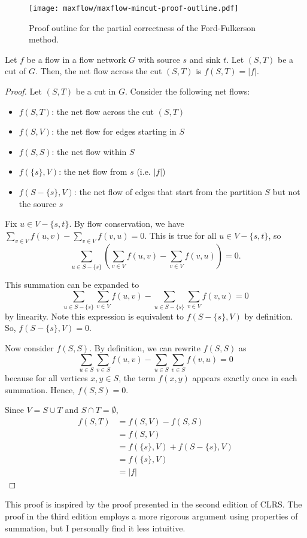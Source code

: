 \begin{figure}[htbp]
    \centering
    \texttt{[image: maxflow/maxflow-mincut-proof-outline.pdf]}
    \hfill
    \caption{Proof outline for the partial correctness of the Ford-Fulkerson method.}
    \label{fig:maxflow-ford-fulkerson-proof}
\end{figure}

\begin{lemma} \label{lem:flow-across-cut}
    Let $f$ be a flow in a flow network $G$ with source $s$ and sink $t$. Let $(S,T)$ be a cut of $G$. Then, the net flow across the cut $(S,T)$ is $f(S,T) = |f|$.
\end{lemma}

\begin{proof}
    Let $(S,T)$ be a cut in $G$. Consider the following net flows:
    \begin{itemize}
        \item $f(S,T)$: the net flow across the cut $(S,T)$ 
        \item $f(S,V)$: the net flow for edges starting in $S$
        \item $f(S,S)$: the net flow within $S$ 
        \item $f(\{s\},V)$: the net flow from $s$ (i.e. $|f|$)
        \item $f(S-\{s\},V)$: the net flow of edges that start from the partition $S$ but not the source $s$ 
    \end{itemize}
    Fix $u \in V - \{s,t\}$. By flow conservation, we have $\sum_{v \in V} f(u,v) - \sum_{v \in V} f(v,u) = 0$. This is true for all $u \in V - \{s,t\}$, so 
    $$\sum_{u \in S-\{s\}} \left(\sum_{v \in V} f(u,v) - \sum_{v \in V} f(v,u)\right) = 0.$$ 
    
    This summation can be expanded to 
    $$\sum_{u \in S-\{s\}}\sum_{v \in V} f(u,v) - \sum_{u \in S-\{s\}}\sum_{v \in V} f(v,u) = 0$$
    by linearity. Note this expression is equivalent to $f(S-\{s\},V)$ by definition. So, $f(S-\{s\},V) = 0$.

    Now consider $f(S,S)$. By definition, we can rewrite $f(S,S)$ as 
    $$\sum_{u \in S}\sum_{v \in S} f(u,v) - \sum_{u \in S}\sum_{v \in S} f(v,u) = 0$$
    because for all vertices $x,y \in S$, the term $f(x,y)$ appears exactly once in each summation. Hence, $f(S,S) = 0$.

    Since $V = S \cup T$ and $S \cap T = \emptyset$,
    $$
    \begin{aligned}
        f(S,T) &= f(S,V) - f(S,S) \\
        &= f(S,V) \\
        &= f(\{s\},V) + f(S-\{s\},V) \\
        &= f(\{s\},V) \\
        &= |f|
    \end{aligned}
    $$ 
\end{proof}
This proof is inspired by the proof presented in the second edition of CLRS. The proof in the third edition employs a more rigorous argument using properties of summation, but I personally find it less intuitive.

